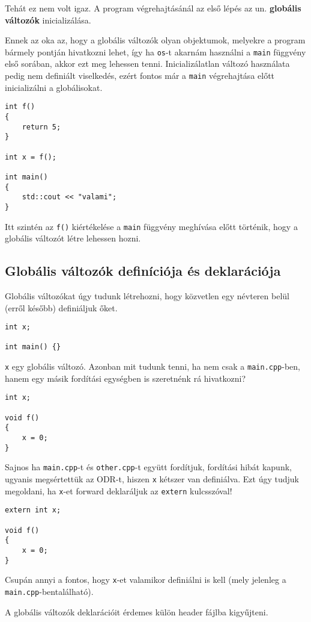 \documentclass[a4paper,11.5pt,table]{article}
\begin{document}
	Tehát ez nem volt igaz. A program végrehajtásánál az első lépés az un. \textbf{globális változók} inicializálása. 
	
	Ennek az oka az, hogy a globális változók olyan objektumok, melyekre a program bármely pontján hivatkozni lehet, így ha \texttt{os}-t akarnám használni a \texttt{main} függvény első sorában, akkor ezt meg lehessen tenni. Inicializálatlan változó használata pedig nem definiált viselkedés, ezért fontos már a \texttt{main} végrehajtása előtt inicializálni a globálisokat.
	\begin{lstlisting}
int f()
{
	return 5;
}

int x = f();

int main()
{
	std::cout << "valami";
}
	\end{lstlisting}
	Itt szintén az \texttt{f()} kiértékelése a \texttt{main} függvény meghívása előtt történik, hogy a globális változót létre lehessen hozni.
	\subsection{Globális változók definíciója és deklarációja}
	Globális változókat úgy tudunk létrehozni, hogy közvetlen egy névteren belül (erről később) definiáljuk őket.
	\medskip
	
	\begin{lstlisting}
int x;

int main() {}
	\end{lstlisting}
	\texttt{x} egy globális változó. Azonban mit tudunk tenni, ha nem csak a \texttt{main.cpp}-ben, hanem egy másik fordítási egységben is szeretnénk rá hivatkozni?
	\medskip
	
	\begin{lstlisting}
int x;

void f() 
{
	x = 0;
}
	\end{lstlisting}
  Sajnos ha \texttt{main.cpp}-t és \texttt{other.cpp}-t együtt fordítjuk, fordítási hibát kapunk, ugyanis megsértettük az ODR-t, hiszen \texttt{x} kétszer van definiálva. Ezt úgy tudjuk megoldani, ha \texttt{x}-et forward deklaráljuk az \texttt{extern} kulcsszóval!
	\medskip
	
	\begin{lstlisting}
extern int x;

void f() 
{
	x = 0;
}
	\end{lstlisting}
	Csupán annyi a fontos, hogy \texttt{x}-et valamikor definiálni is kell (mely jelenleg a \texttt{main.cpp}-bentalálható).
	\begin{note}
		A globális változók deklarációit érdemes külön header fájlba kigyűjteni.
	\end{note}
\end{document}
